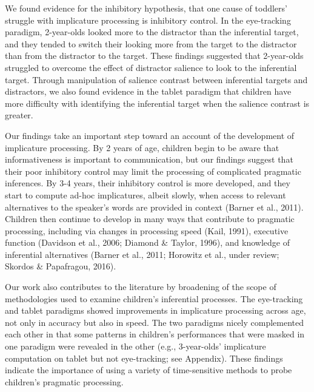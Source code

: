 \documentclass[a4paper,man,apacite,floatsintext]{apa6}
\begin{document}
We found evidence for the inhibitory hypothesis, that one cause of
toddlers' struggle with implicature processing is inhibitory control. In
the eye-tracking paradigm, 2-year-olds looked more to the distractor
than the inferential target, and they tended to switch their looking
more from the target to the distractor than from the distractor to the
target. These findings suggested that 2-year-olds struggled to overcome
the effect of distractor salience to look to the inferential target.
Through manipulation of salience contrast between inferential targets
and distractors, we also found evidence in the tablet paradigm that
children have more difficulty with identifying the inferential target
when the salience contrast is greater.

Our findings take an important step toward an account of the development
of implicature processing. By 2 years of age, children begin to be aware
that informativeness is important to communication, but our findings
suggest that their poor inhibitory control may limit the processing of
complicated pragmatic inferences. By 3-4 years, their inhibitory control
is more developed, and they start to compute ad-hoc implicatures, albeit
slowly, when access to relevant alternatives to the speaker's words are
provided in context (Barner et al., 2011). Children then continue to
develop in many ways that contribute to pragmatic processing, including
via changes in processing speed (Kail, 1991), executive function
(Davidson et al., 2006; Diamond \& Taylor, 1996), and knowledge of
inferential alternatives (Barner et al., 2011; Horowitz et al., under
review; Skordos \& Papafragou, 2016).

Our work also contributes to the literature by broadening of the scope
of methodologies used to examine children's inferential processes. The
eye-tracking and tablet paradigms showed improvements in implicature
processing across age, not only in accuracy but also in speed. The two
paradigms nicely complemented each other in that some patterns in
children's performances that were masked in one paradigm were revealed
in the other (e.g., 3-year-olds' implicature computation on tablet but
not eye-tracking; see Appendix). These findings indicate the importance
of using a variety of time-sensitive methods to probe children's
pragmatic processing.
\end{document}

